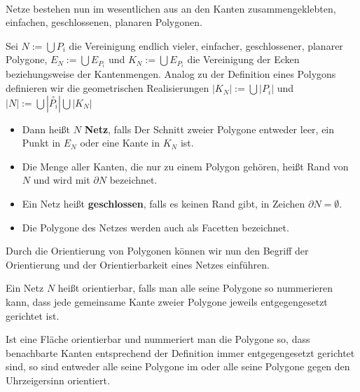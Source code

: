   \\
 

Netze bestehen nun im wesentlichen aus an den Kanten zusammengeklebten, einfachen, geschlossenen, planaren Polygonen.

\begin{Definition}
Sei $N:= \bigcup P_i$ die Vereinigung endlich vieler, einfacher, geschlossener, planarer Polygone, 
$E_N := \bigcup E_{P_i}$ und $K_N := \bigcup E_{P_i}$ die Vereinigung der Ecken beziehungsweise der Kantenmengen.
Analog zu der Definition eines Polygons definieren wir die geometrischen Realisierungen 
$|K_N| := \bigcup |P_i|$ und $|N| := \bigcup |\overset{\circ}{P_i}| \bigcup |K_N|$
\begin{itemize}
\item Dann heißt $N$ \textbf{Netz}, falls Der Schnitt zweier Polygone entweder leer, ein Punkt in $E_N$ oder eine Kante in $K_N$ ist. 

\item Die Menge aller Kanten, die nur zu einem Polygon gehören, heißt Rand von $N$ und wird mit $\partial N$ bezeichnet.
\item Ein Netz heißt \textbf{geschlossen}, falls es keinen Rand gibt, in Zeichen $\partial N = \emptyset$. 
\item Die Polygone des Netzes werden auch als Facetten bezeichnet.
\end{itemize}
\end{Definition} 


Durch die  Orientierung von Polygonen können wir nun den Begriff der Orientierung und der Orientierbarkeit eines Netzes einführen.

\begin{Definition}
Ein Netz $N$ heißt orientierbar, falls man alle seine Polygone so nummerieren kann, dass jede gemeinsame Kante zweier Polygone jeweils entgegengesetzt gerichtet ist. 
\end{Definition}


  

\begin{Bemerkung}
Ist eine Fläche orientierbar und nummeriert man die Polygone so, dass benachbarte Kanten entsprechend der Definition immer entgegengesetzt gerichtet sind, so sind entweder alle seine Polygone im oder alle seine Polygone gegen den Uhrzeigersinn orientiert.
\end{Bemerkung}

